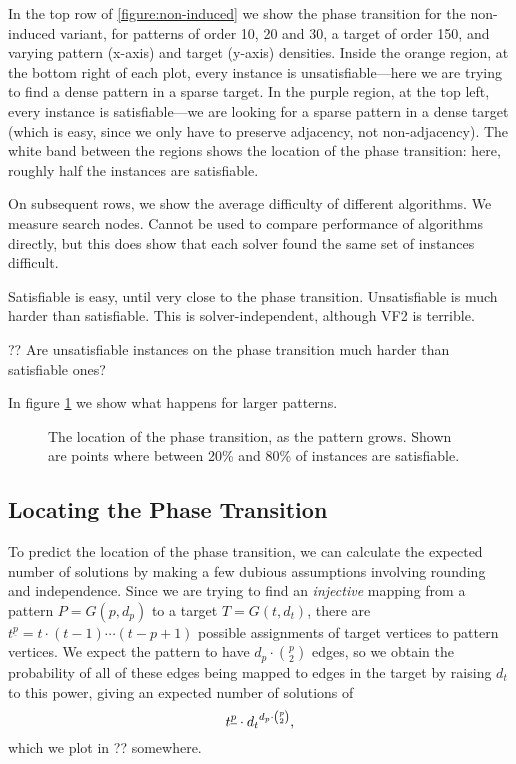 \documentclass[letterpaper]{article}
\begin{document}
In the top row of \cref{figure:non-induced} we show the phase transition for the non-induced
variant, for patterns of order 10, 20 and 30, a target of order 150, and varying pattern (x-axis)
and target (y-axis) densities. Inside the orange region, at the bottom right of each plot, every
instance is unsatisfiable---here we are trying to find a dense pattern in a sparse target. In the
purple region, at the top left, every instance is satisfiable---we are looking for a sparse pattern
in a dense target (which is easy, since we only have to preserve adjacency, not non-adjacency). The
white band between the regions shows the location of the phase transition: here, roughly half the
instances are satisfiable.

On subsequent rows, we show the average difficulty of different algorithms.  We measure search
nodes. Cannot be used to compare performance of algorithms directly, but this does show that each
solver found the same set of instances difficult.

Satisfiable is easy, until very close to the phase transition. Unsatisfiable is much harder than
satisfiable. This is solver-independent, although VF2 is terrible.

?? Are unsatisfiable instances on the phase transition much harder than satisfiable ones?

In figure \cref{figure:phase-transition-bands} we show what happens for larger patterns.

\begin{figure}[tb]
    
    \caption{The location of the phase transition, as the pattern grows. Shown are points where
    between 20\% and 80\% of instances are satisfiable.}
    \label{figure:phase-transition-bands}
\end{figure}

\subsection{Locating the Phase Transition}

To predict the location of the phase transition, we can calculate the expected number of solutions
by making a few dubious assumptions involving rounding and independence. Since we are trying to find
an \emph{injective} mapping from a pattern $P = G(p, d_p)$ to a target $T = G(t, d_t)$, there are
$t^{\underline{p}} = t \cdot (t - 1)\cdots(t - p + 1)$ possible assignments of target vertices to
pattern vertices.  We expect the pattern to have $d_p \cdot \binom{p}{2}$ edges, so we obtain the
probability of all of these edges being mapped to edges in the target by raising $d_t$ to this
power, giving an expected number of solutions of \[ t^{\underline{p}} \cdot {d_t}^{d_p \cdot
\binom{p}{2}} \textnormal{,} \] which we plot in ?? somewhere.
\end{document}
